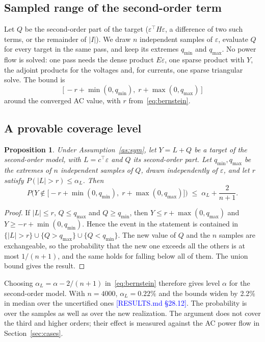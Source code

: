 \documentclass[preprint,12pt]{elsarticle}
\newcommand{\src}[1]{\textcolor{blue}{[#1]}}          %
\newtheorem{proposition}{Proposition}
\begin{document}
\subsection{Sampled range of the second-order term}
Let $Q$ be the second-order part of the target ($\varepsilon^\top H\varepsilon$, a difference of two such terms, or
the remainder of $|I|$). We draw $n$ independent samples of $\varepsilon$, evaluate $Q$ for every target in the same
pass, and keep its extremes $q_{\min}$ and $q_{\max}$. No power flow is solved: one pass needs the dense product
$E\varepsilon$, one sparse product with $Y$, the adjoint products for the voltages and, for currents, one sparse
triangular solve. The bound is
\begin{equation}\label{eq:bound}
\Big[\,-r + \min(0, q_{\min}),\; r + \max(0, q_{\max})\,\Big]
\end{equation}
around the converged AC value, with $r$ from~\eqref{eq:bernstein}.

\subsection{A provable coverage level}
\begin{proposition}\label{prop:cert}
Under Assumption~\ref{as:sym}, let $Y = L + Q$ be a target of the second-order model, with $L = c^\top\varepsilon$
and $Q$ its second-order part. Let $q_{\min}, q_{\max}$ be the extremes of $n$ independent samples of $Q$, drawn
independently of $\varepsilon$, and let $r$ satisfy $P(|L| > r)\le\alpha_L$. Then
\[
P\Big(Y \notin \big[-r + \min(0,q_{\min}),\; r + \max(0,q_{\max})\big]\Big) \;\le\; \alpha_L + \frac{2}{n+1}.
\]
\end{proposition}
\begin{proof}
If $|L|\le r$, $Q\le q_{\max}$ and $Q\ge q_{\min}$, then $Y\le r + \max(0,q_{\max})$ and
$Y\ge -r + \min(0,q_{\min})$. Hence the event in the statement is contained in
$\{|L|>r\}\cup\{Q>q_{\max}\}\cup\{Q<q_{\min}\}$. The new value of $Q$ and the $n$ samples are exchangeable, so the
probability that the new one exceeds all the others is at most $1/(n+1)$, and the same holds for falling below all
of them. The union bound gives the result.
\end{proof}
\noindent Choosing $\alpha_L = \alpha - 2/(n+1)$ in~\eqref{eq:bernstein} therefore gives level $\alpha$ for the
second-order model. With $n = 4000$, $\alpha_L = 0.22\%$ and the bounds widen by 2.2\% in median over the uncertified
ones \src{RESULTS.md §28.12}. The probability is over the samples as well as over the new realization. The argument
does not cover the third and higher orders; their effect is measured against the AC power flow in
Section~\ref{sec:cases}.
\end{document}
